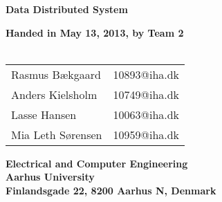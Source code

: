 \documentclass[a4paper,10pt]{report}
\begin{document}
\begin{titlepage}
\begin{center}
{\LARGE \textbf{Data Distributed System}}


\vspace{4cm}
\textbf{Handed in May 13, 2013, by Team 2}\\~\\
\begin{tabular}{ll}
Rasmus Bækgaard  & 10893@iha.dk \\
Anders Kielsholm  & 10749@iha.dk \\
Lasse Hansen  & 10063@iha.dk \\
Mia Leth Sørensen & 10959@iha.dk \\
\end{tabular}
\vfill
\textbf{Electrical and Computer Engineering}\\
\textbf{Aarhus University}\\
\textbf{Finlandsgade 22, 8200 Aarhus N, Denmark}
\end{center}
\end{titlepage}















\end{document}
